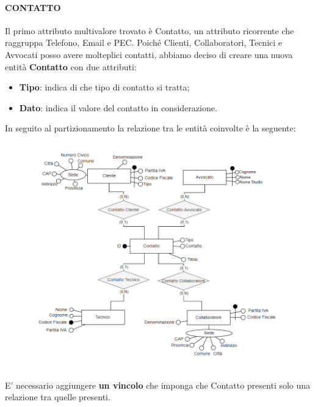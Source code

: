 \documentclass{elegantbook}
\begin{document}
		\paragraph{CONTATTO}
		Il primo attributo multivalore trovato è Contatto, un attributo ricorrente che raggruppa Telefono, Email e PEC. Poiché Clienti, Collaboratori, Tecnici e Avvocati posso avere molteplici contatti, abbiamo deciso di creare una nuova entità \textbf{Contatto} con due attributi:
		\begin{itemize} 
			\item\textbf{Tipo}: indica di che tipo di contatto si tratta;
			\item \textbf{Dato}: indica il valore del contatto in considerazione.
		\end{itemize} 	
		In seguito al partizionamento la relazione tra le entità coinvolte è la seguente:
		\begin{figure}[H]
			\centering
			\includegraphics[scale=0.4]{../Img/DBSchemes/Contatto.png}
		\end{figure}
		E' necessario aggiungere \textbf{un vincolo} che imponga che Contatto presenti solo una relazione tra quelle presenti.
		
\end{document}
